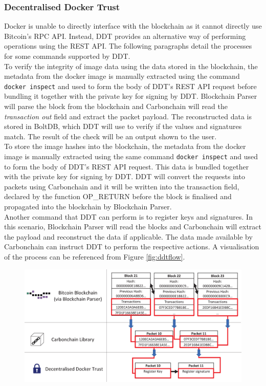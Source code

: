\documentclass[a4paper,12pt]{article}
\begin{document}
{	\subsubsection[Decentralised Docker Trust]{Decentralised Docker Trust}
	\label{sect:ddt}
	{\par \noindent
	Docker is unable to directly interface with the blockchain as it cannot directly use Bitcoin's \ac{RPC} \ac{API}. Instead, \ac{DDT} provides an alternative way of performing operations using the \ac{REST} \ac{API}. The following paragraphs detail the processes for some commands supported by \ac{DDT}.\\\newline
\noindent
	To verify the integrity of image data using the data stored in the blockchain, the metadata from the docker image is manually extracted using the command \texttt{docker inspect} and used to form the body of \ac{DDT}'s \ac{REST} \ac{API} request before bundling it together with the private key for signing by \ac{DDT}. Blockchain Parser will parse the block from the blockchain and Carbonchain will read the \textit{transaction out} field and extract the packet payload. The reconstructed data is stored in BoltDB, which \ac{DDT} will use to verify if the values and signatures match. The result of the check will be an output shown to the user.\\\newline
\noindent
	To store the image hashes into the blockchain, the metadata from the docker image is manually extracted using the same command \texttt{docker inspect} and used to form the body of \ac{DDT}'s \ac{REST} \ac{API} request. This data is bundled together with the private key for signing by \ac{DDT}. \ac{DDT} will convert the requests into packets using Carbonchain and it will be written into the transaction field, declared by the function OP\_RETURN before the block is finalised and propagated into the blockchain by Blockchain Parser.\\\newline
	\noindent
	Another command that \ac{DDT} can perform is to register keys and signatures. In this scenario, Blockchain Parser will read the blocks and Carbonchain will extract the payload and reconstruct the data if applicable. The data made available by Carbonchain can instruct \ac{DDT} to perform the respective actions. A visualisation of the process can be referenced from Figure \ref{fig:ddtflow}. 
	\begin{figure}[H]
		\centering
		\includegraphics[width=1\linewidth]{DDTflow}

\end{figure}}}
\end{document}
